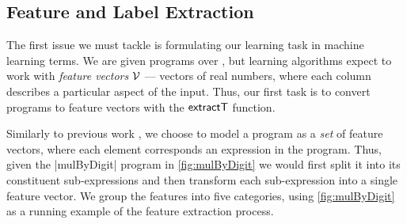 



\subsection{Feature and Label Extraction}
\label{subsec:extract}
The first issue we must tackle is formulating our learning task in machine
learning terms. We are given programs over \repairLang, but learning algorithms
expect to work with \emph{feature vectors} $\mathcal{V}$ --- vectors of real numbers,
where each column describes a particular aspect of the input. Thus, our first
task is to convert programs to feature vectors with the $\mathsf{extractT}$ function.

Similarly to previous work \citep{Seidel:2017}, we choose to model a program as
a \emph{set} of feature vectors, where each element corresponds an expression in
the program. Thus, given the |mulByDigit| program in \autoref{fig:mulByDigit} we
would first split it into its constituent sub-expressions and then transform
each sub-expression into a single feature vector. We group the features into
five categories, using \autoref{fig:mulByDigit} as a running example of the
feature extraction process.

